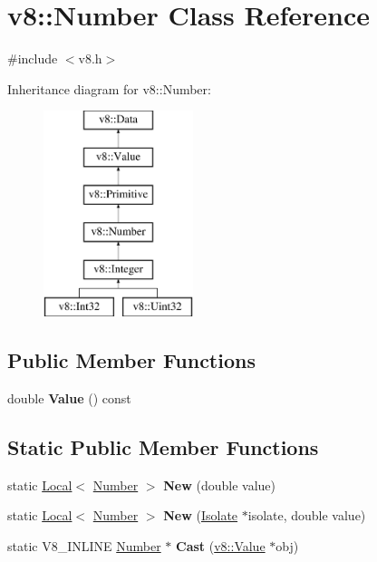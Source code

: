 \hypertarget{classv8_1_1_number}{}\section{v8\+:\+:Number Class Reference}
\label{classv8_1_1_number}


{\ttfamily \#include $<$v8.\+h$>$}

Inheritance diagram for v8\+:\+:Number\+:\begin{figure}[H]
\begin{center}
\leavevmode
\includegraphics[height=6.000000cm]{classv8_1_1_number}
\end{center}
\end{figure}
\subsection*{Public Member Functions}
\begin{DoxyCompactItemize}
\item 
\hypertarget{classv8_1_1_number_ae7ca1af5dd34a7a32a69f57a910ab269}{}double {\bfseries Value} () const \label{classv8_1_1_number_ae7ca1af5dd34a7a32a69f57a910ab269}

\end{DoxyCompactItemize}
\subsection*{Static Public Member Functions}
\begin{DoxyCompactItemize}
\item 
\hypertarget{classv8_1_1_number_aca00a12725ca6fefb326b7e00f3d252c}{}static \hyperlink{classv8_1_1_local}{Local}$<$ \hyperlink{classv8_1_1_number}{Number} $>$ {\bfseries New} (double value)\label{classv8_1_1_number_aca00a12725ca6fefb326b7e00f3d252c}

\item 
\hypertarget{classv8_1_1_number_a90ea55018560648ffaf8861372b41928}{}static \hyperlink{classv8_1_1_local}{Local}$<$ \hyperlink{classv8_1_1_number}{Number} $>$ {\bfseries New} (\hyperlink{classv8_1_1_isolate}{Isolate} $\ast$isolate, double value)\label{classv8_1_1_number_a90ea55018560648ffaf8861372b41928}

\item 
\hypertarget{classv8_1_1_number_a053d48e0003104308963a4a7e3881912}{}static V8\+\_\+\+I\+N\+L\+I\+N\+E \hyperlink{classv8_1_1_number}{Number} $\ast$ {\bfseries Cast} (\hyperlink{classv8_1_1_value}{v8\+::\+Value} $\ast$obj)\label{classv8_1_1_number_a053d48e0003104308963a4a7e3881912}

\end{DoxyCompactItemize}


